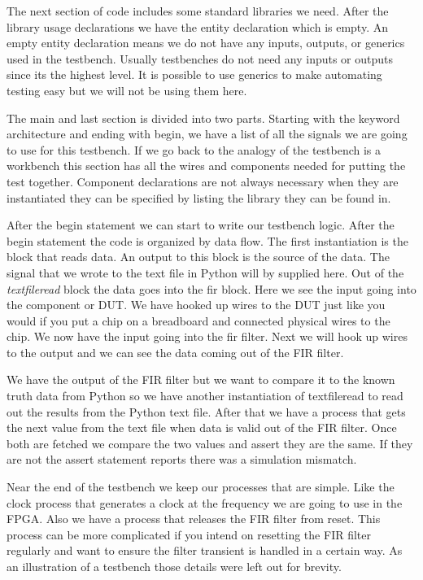 The next section of code includes some standard libraries we need. After the library usage declarations we have the entity declaration which is empty. An empty entity declaration means we do not have any inputs, outputs, or generics used in the testbench. Usually testbenches do not need any inputs or outputs since its the highest level. It is possible to use generics to make automating testing easy but we will not be using them here.

The main and last section is divided into two parts. Starting with the keyword architecture and ending with begin, we have a list of all the signals we are going to use for this testbench. If we go back to the analogy of the testbench is a workbench this section has all the wires and components needed for putting the test together. Component declarations are not always necessary when they are instantiated they can be specified by listing the library they can be found in.

After the begin statement we can start to write our testbench logic. After the begin statement the code is organized by data flow. The first instantiation is the block that reads data. An output to this block is the source of the data. The signal that we wrote to the text file in Python will by supplied here. Out of the \emph{textfileread} block the data goes into the fir block. Here we see the input going into the component or \ac{DUT}. We have hooked up wires to the \ac{DUT} just like you would if you put a chip on a breadboard and connected physical wires to the chip. We now have the input going into the fir filter. Next we will hook up wires to the output and we can see the data coming out of the \ac{FIR} filter.

We have the output of the \ac{FIR} filter but we want to compare it to the known truth data from Python so we have another instantiation of textfileread to read out the results from the Python text file. After that we have a process that gets the next value from the text file when data is valid out of the \ac{FIR} filter. Once both are fetched we compare the two values and assert they are the same. If they are not the assert statement reports there was a simulation mismatch.

Near the end of the testbench we keep our processes that are simple. Like the clock process that generates a clock at the frequency we are going to use in the \ac{FPGA}. Also we have a process that releases the \ac{FIR} filter from reset. This process can be more complicated if you intend on resetting the \ac{FIR} filter regularly and want to ensure the filter transient is handled in a certain way. As an illustration of a testbench those details were left out for brevity.

